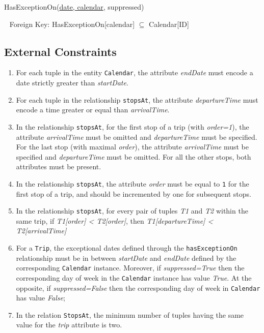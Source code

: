 	HasExceptionOn(\uline{date, calendar}, suppressed)

	$ \ \ $ Foreign Key: HasExceptionOn[calendar] $\subseteq$ Calendar[ID]

\subsection{External Constraints}

\begin{enumerate}
	\item For each tuple in the entity \texttt{Calendar}, the attribute \textit{endDate} must encode a date strictly greater than \textit{startDate}.

	\item For each tuple in the relationship \texttt{stopsAt}, the attribute \textit{departureTime} must encode a time greater or equal than \textit{arrivalTime}.

	\item In the relationship \texttt{stopsAt}, for the first stop of a trip (with \textit{order=1}), the attribute \textit{arrivalTime} must be omitted and \textit{departureTime} must be specified. For the last stop (with maximal \textit{order}), the attribute \textit{arrivalTime} must be specified and \textit{departureTime} must be omitted. For all the other stops, both attributes must be present.

	\item In the relationship \texttt{stopsAt}, the attribute \textit{order} must be equal to \texttt{1} for the first stop of a trip, and should be incremented by one for subsequent stops.

	\item In the relationship \texttt{stopsAt}, for every pair of tuples \textit{T1} and \textit{T2} within the same trip, if \textit{T1[order] < T2[order]}, then \textit{T1[departureTime] < T2[arrivalTime]}

	\item For a \texttt{Trip}, the exceptional dates defined through the \texttt{hasExceptionOn} relationship must be in between \textit{startDate} and \textit{endDate} defined by the corresponding \texttt{Calendar} instance. Moreover, if \textit{suppressed=True} then the corresponding day of week in the \texttt{Calendar} instance has value \textit{True}. At the opposite, if \textit{suppressed=False} then the corresponding day of week in \texttt{Calendar} has value \textit{False};

	\item In the relation \texttt{StopsAt}, the minimum number of tuples having the same value for the \textit{trip} attribute is two.
\end{enumerate}

